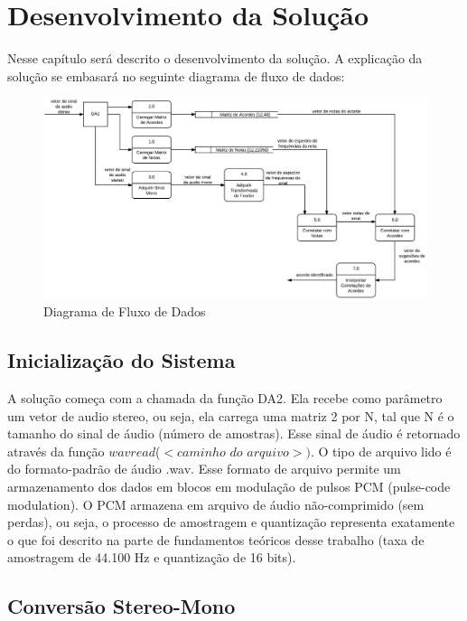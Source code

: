 \chapter{Desenvolvimento da Solução}
\label{chap:solucaocompleta}

Nesse capítulo será descrito o desenvolvimento da solução. A explicação da solução se embasará no seguinte diagrama de fluxo de dados:

\begin{figure}[h]
	\centering
		\includegraphics[keepaspectratio=true,scale=0.315]{figuras/dfd.eps}
	\caption{Diagrama de Fluxo de Dados}
\end{figure}

\section{Inicialização do Sistema}
\label{sec:inicializacao}

A solução começa com a chamada da função DA2. Ela recebe como parâmetro um vetor de audio stereo, ou seja, ela carrega uma matriz 2 por N, tal que N é o tamanho do sinal de áudio (número de amostras). Esse sinal de áudio é retornado através da função $wavread$($<$$caminho$ $do$ $arquivo$$>$$)$. O tipo de arquivo lido é do formato-padrão de áudio .wav. Esse formato de arquivo permite um armazenamento dos dados em blocos em modulação de pulsos PCM (pulse-code modulation). O PCM armazena em arquivo de áudio não-comprimido (sem perdas), ou seja, o processo de amostragem e quantização representa exatamente o que foi descrito na parte de fundamentos teóricos desse trabalho (taxa de amostragem de 44.100 Hz e quantização de 16 bits).

\section{Conversão Stereo-Mono}
\label{sec:conversao}

